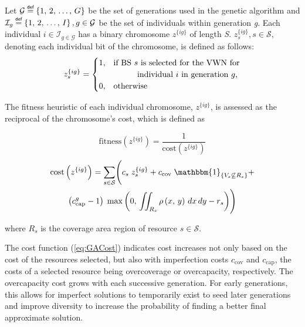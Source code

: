 \documentclass[conference]{IEEEtran}
\newcommand\myeq{\mathrel{\overset{\makebox[0pt]{\mbox{\normalfont\tiny\sffamily def}}}{=}}}
\begin{document}
Let $\mathcal{G} \myeq \left\{1,\, 2,\, \ldots,\, G\right\}$ be the set of generations used in the genetic algorithm and $\mathcal{I}_g \myeq \left\{1,\, 2,\, \ldots,\, I\right\}, g \in \mathcal{G}$ be the set of individuals within generation \textit{g}.  Each individual $i \in \mathcal{I}_{g \in \mathcal{G}}$ has a binary chromosome $z^{\{ig\}}$ of length \textit{S}.  $z_s^{\{ig\}}, s \in \mathcal{S}$, denoting each individual bit of the chromosome, is defined as follows:
\[ z_s^{\{ig\}} =
	\begin{cases}
		1,& \text{if BS $s$ is selected for the VWN for}\\
		& \hspace{0.4in} \text{individual $i$ in generation $g$,}\\
		0,& \text{otherwise}
	\end{cases}
\]

The fitness heuristic of each individual chromosome, $z^{\{ig\}}$, is assessed as the reciprocal of the chromosome's cost, which is defined as

\begin{equation} \label{eq:GAFit}
\text{fitness}\left(z^{\{ig\}}\right) = \frac{1}{\text{cost}\left(z^{\{ig\}}\right)}
\end{equation}
\vspace{0.2in}
\begin{equation}
\nonumber
\end{equation}
\begin{multline} \label{eq:GACost}
\text{cost}\left(z^{\{ig\}}\right) = \sum_{s \in \mathcal{S}} \Biggl( c_s \; z_s^{\{ig\}} + c_\text{cov} \; \mathbbm{1}_{\left\{ V_s \not\subseteq R_s \right\}} + \\ \left(c_\text{cap}^g - 1\right) \; \max\left( 0,\, \iint_{R_s} \rho\left(x,\, y\right)\, dx\, dy - r_s \right) \Biggr)
\end{multline}

\noindent where $R_s$ is the coverage area region of resource $s \in \mathcal{S}$.

The cost function (\ref{eq:GACost}) indicates cost increases not only based on the cost of the resources selected, but also with imperfection costs $c_\text{cov}$ and $c_\text{cap}$, the costs of a selected resource being overcoverage or overcapacity, respectively.  The overcapacity cost grows with each successive generation.  For early generations, this allows for imperfect solutions to temporarily exist to seed later generations and improve diversity to increase the probability of finding a better final approximate solution.
\end{document}
